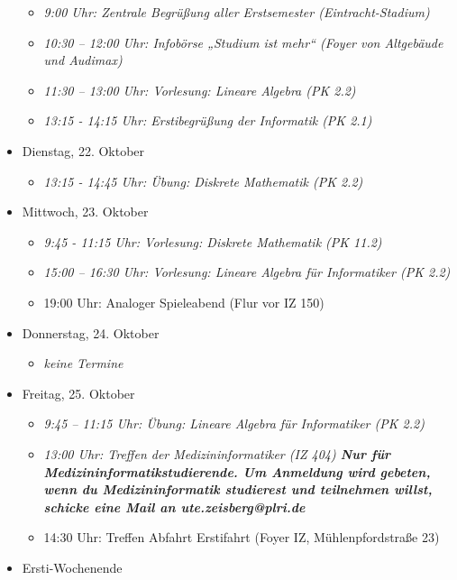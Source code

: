 \begin{itemize}
        \begin{itemize}
            \item \textit{9:00 Uhr: Zentrale Begrüßung aller Erstsemester (Eintracht-Stadium)}
            \item \textit{10:30 – 12:00 Uhr: Infobörse „Studium ist mehr“ (Foyer von Altgebäude und Audimax)}
            \item \textit{11:30 – 13:00 Uhr: Vorlesung: Lineare Algebra (PK 2.2)}
            \item \textit{13:15 - 14:15 Uhr: Erstibegrüßung der Informatik (PK 2.1)}
        \end{itemize}
    \item Dienstag, 22. Oktober
        \begin{itemize}
            \item \textit{13:15 - 14:45 Uhr: Übung: Diskrete Mathematik (PK 2.2)}
        \end{itemize}
    \item Mittwoch, 23. Oktober
        \begin{itemize}
            \item \textit{9:45 - 11:15 Uhr: Vorlesung: Diskrete Mathematik (PK 11.2)}
            \item \textit{15:00 – 16:30 Uhr: Vorlesung: Lineare Algebra für Informatiker (PK 2.2)}
            \item 19:00 Uhr: Analoger Spieleabend (Flur vor IZ 150)
        \end{itemize}
    \item Donnerstag, 24. Oktober
        \begin{itemize}
            \item \textit{keine Termine}
        \end{itemize}
    \item Freitag, 25. Oktober
        \begin{itemize}
            \item \textit{9:45 – 11:15 Uhr: Übung: Lineare Algebra für Informatiker (PK 2.2)}
            \item \textit{13:00 Uhr: Treffen der Medizininformatiker (IZ 404) \textbf{Nur für Medizininformatikstudierende. Um Anmeldung wird gebeten, wenn du Medizininformatik studierest und teilnehmen willst, schicke eine Mail an ute.zeisberg@plri.de}}
            \item 14:30 Uhr: Treffen Abfahrt Erstifahrt (Foyer IZ, Mühlenpfordstraße 23)
        \end{itemize}
    \item Ersti-Wochenende

\end{itemize}
